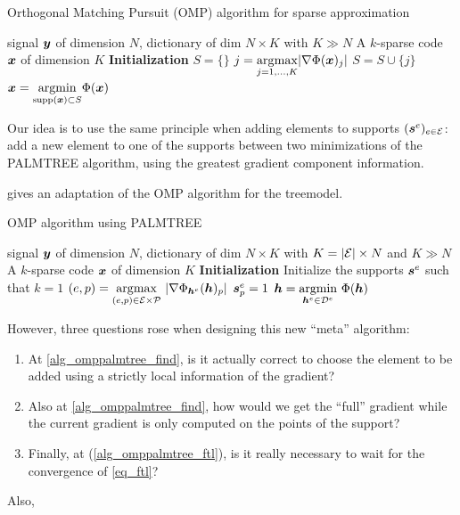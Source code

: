 \begin{algorithm}[!ht]
    \caption{Orthogonal Matching Pursuit (OMP) algorithm for sparse approximation}\label{alg_omp}
  \begin{algorithmic}[1]
    \Input signal $\bm{y}$ of dimension $N$, dictionary of dim $N \times K$ with $K \gg N$
    \Output A $k$-sparse code $\bm{x}$ of dimension $K$
    \State \textbf{Initialization} $S=\{\}$
      \State $j =  \underset{j = 1,\dots,K}{\operatorname*{\arg\!\max}} | \nabla \Phi(\bm{x})_j |$ \label{alg_omp_pick_correlation}
      \State $S = S \cup \{j\}$
      \State $\bm{x} = \underset{\text{supp}(\bm{x}) \subset S}{\operatorname{argmin}} \Phi(\bm{x})$
    \EndFor
  \end{algorithmic}
\end{algorithm}

Our idea is to use the same principle when adding elements to supports $(\bm{s}^e)_{e \in \mathcal E}$: add a new element to one of the supports between two minimizations of the \ac{PALMTREE} algorithm, using the greatest gradient component information.

 gives an adaptation of the \ac{OMP} algorithm for the \gls{treemodel}.

\begin{algorithm}[!ht]
    \caption{\ac{OMP} algorithm using \ac{PALMTREE}}\label{alg_omppalmtree}
  \begin{algorithmic}[1]
    \Input signal $\bm{y}$ of dimension $N$, dictionary of dim $N \times K$ with $K = |\mathcal E| \times N$ and $K \gg N$
    \Output A $k$-sparse code $\bm{x}$ of dimension $K$
    \State \textbf{Initialization} Initialize the supports $\bm{s}^e$ such that $k=1$
      \State $(e,p) = \underset{(e,p) \in \mathcal E \times \mathcal P}{\operatorname*{\arg\!\max}}~ |\nabla \Phi_{\bm{h}^e}(\bm{h})_p|$ \label{alg_omppalmtree_find}
      \State $\bm{s}^e_p = 1$
      \State $\bm{h} = \underset{\bm{h}^e \in {\mathcal D}^e}{\operatorname{argmin}}~ \Phi(\bm{h})$  \label{alg_omppalmtree_ftl}
    \EndFor
  \end{algorithmic}
\end{algorithm}


However, three questions rose when designing this new “meta” algorithm:
\begin{enumerate}[label={\alph*)},noitemsep]
	\item At \cref{alg_omppalmtree_find}, is it actually correct to choose the element to be added using a strictly local information of the gradient?
	\item Also at \cref{alg_omppalmtree_find}, how would we get the “full” gradient while the current gradient is only computed on the points of the support?
	\item Finally, at (\cref{alg_omppalmtree_ftl}), is it really necessary to wait for the convergence of \eqref{eq_ftl}?
\end{enumerate}
  Also, 

